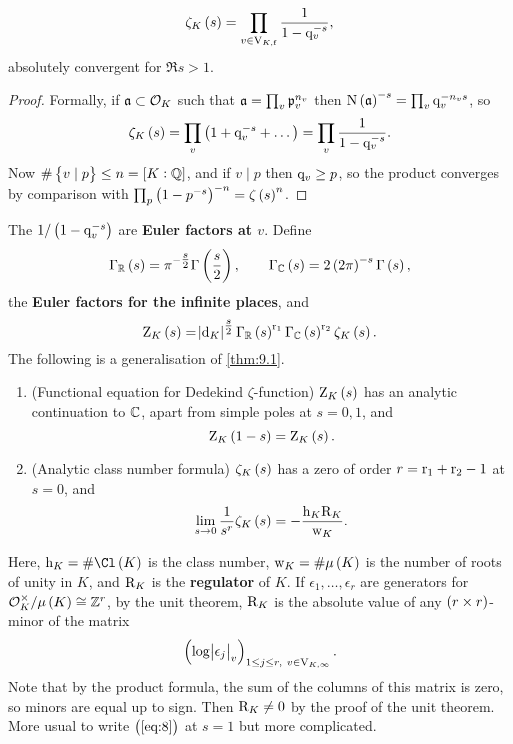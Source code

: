 \begin{proposition}
\label{prop:9.2}
$$ \zeta_K\br{s} = \prod_{v \in \V_{K, \f}} \dfrac{1}{1 - \q_v^{-s}}, $$
absolutely convergent for $ \Re s > 1 $.
\end{proposition}

\begin{proof}
Formally, if $ \mathfrak{a} \subset \mathcal{O}_K $ such that $ \mathfrak{a} = \prod_v \mathfrak{p}_v^{n_v} $ then $ \N\br{\aaa}^{-s} = \prod_v \q_v^{-n_vs} $, so
$$ \zeta_K\br{s} = \prod_v \br{1 + \q_v^{-s} + \dots} = \prod_v \dfrac{1}{1 - \q_v^{-s}}. $$
Now $ \#\cbr{v \mid p} \le n = \sbr{K : \QQ} $, and if $ v \mid p $ then $ \mathrm{q}_v \ge p $, so the product converges by comparison with $ \prod_p \br{1 - p^{-s}}^{-n} = \zeta\br{s}^n $.
\end{proof}

The $ 1 / \br{1 - \q_v^{-s}} $ are \textbf{Euler factors at $ v $}. Define
$$ \Gamma_\RR\br{s} = \pi^{-\tfrac{s}{2}}\Gamma\br{\dfrac{s}{2}}, \qquad \Gamma_\CC\br{s} = 2\br{2\pi}^{-s}\Gamma\br{s}, $$
the \textbf{Euler factors for the infinite places}, and
$$ \Z_K\br{s} = \abs{\d_K}^{\tfrac{s}{2}}\Gamma_\RR\br{s}^{\r_1}\Gamma_\CC\br{s}^{\r_2}\zeta_K\br{s}. $$
The following is a generalisation of \ref{thm:9.1}.

\begin{theorem}
\label{thm:9.3}
\hfill
\begin{enumerate}
\item (Functional equation for Dedekind $ \zeta $-function) $ \Z_K\br{s} $ has an analytic continuation to $ \mathbb{C} $, apart from simple poles at $ s = 0, 1 $, and
$$ \Z_K\br{1 - s} = \Z_K\br{s}. $$
\item (Analytic class number formula) $ \zeta_K\br{s} $ has a zero of order $ r = \mathrm{r}_1 + \mathrm{r}_2 - 1 $ at $ s = 0 $, and
\begin{equation}
\label{eq:8}
\lim_{s \to 0} \dfrac{1}{s^r}\zeta_K\br{s} = -\dfrac{\h_K\R_K}{\w_K}.
\end{equation}
\end{enumerate}
\end{theorem}

Here, $ \h_K = \#\Cl\br{K} $ is the class number, $ \w_K = \#\mu\br{K} $ is the number of roots of unity in $ K $, and $ \mathrm{R}_K $ is the \textbf{regulator} of $ K $. If $ \epsilon_1, \dots, \epsilon_r $ are generators for $ \OOO_K^\times / \mu\br{K} \cong \ZZ^r $, by the unit theorem, $ \mathrm{R}_K $ is the absolute value of any $ \br{r \times r} $-minor of the matrix
$$ \br{\log \abs{\epsilon_j}_v}_{1 \le j \le r, \ v \in \V_{K, \infty}}. $$
Note that by the product formula, the sum of the columns of this matrix is zero, so minors are equal up to sign. Then $ \mathrm{R}_K \ne 0 $ by the proof of the unit theorem. More usual to write $ \br{\ref{eq:8}} $ at $ s = 1 $ but more complicated.

